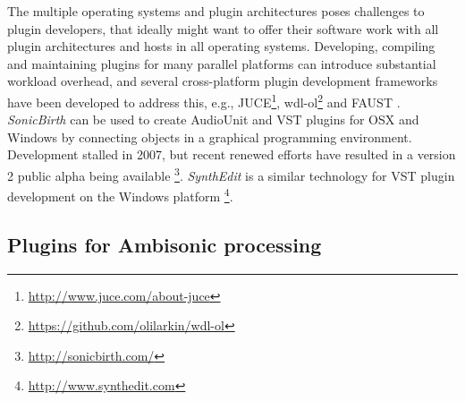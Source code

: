 \documentclass{article}
\begin{document}
The multiple operating systems and plugin architectures poses challenges to plugin developers, that ideally might want to offer their software work with all plugin architectures and hosts in all operating systems.
Developing, compiling and maintaining plugins for many parallel platforms can introduce substantial workload overhead, and several cross-platform plugin development frameworks have been developed to address this, e.g., JUCE\footnote{\href{http://www.juce.com/about-juce}{http://www.juce.com/about-juce}}, wdl-ol\footnote{\href{https://github.com/olilarkin/wdl-ol}{https://github.com/olilarkin/wdl-ol}} and FAUST \cite{smithFaust:2012}. 
\emph{SonicBirth} can be used to create AudioUnit and VST plugins for OSX and Windows by connecting objects in a graphical programming environment. Development stalled in 2007, but recent renewed efforts have resulted in a version 2 public alpha being available \footnote{\href{http://sonicbirth.com/}{http://sonicbirth.com/}}.
\emph{SynthEdit} is a similar technology for VST plugin development on the Windows platform \footnote{\href{http://www.synthedit.com}{http://www.synthedit.com}}.


\subsection{Plugins for Ambisonic processing}\label{sec:ambi-plugins}
\end{document}

